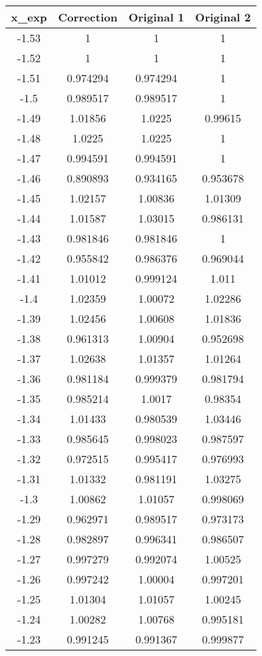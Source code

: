 \begin{table}[h!]
\centering
\begin{tabular}{|c|c|c|c|}
\hline
x_exp & Correction & Original 1 & Original 2 \\
\hline
-1.53 & 1 & 1 & 1 \\
-1.52 & 1 & 1 & 1 \\
-1.51 & 0.974294 & 0.974294 & 1 \\
-1.5 & 0.989517 & 0.989517 & 1 \\
-1.49 & 1.01856 & 1.0225 & 0.99615 \\
-1.48 & 1.0225 & 1.0225 & 1 \\
-1.47 & 0.994591 & 0.994591 & 1 \\
-1.46 & 0.890893 & 0.934165 & 0.953678 \\
-1.45 & 1.02157 & 1.00836 & 1.01309 \\
-1.44 & 1.01587 & 1.03015 & 0.986131 \\
-1.43 & 0.981846 & 0.981846 & 1 \\
-1.42 & 0.955842 & 0.986376 & 0.969044 \\
-1.41 & 1.01012 & 0.999124 & 1.011 \\
-1.4 & 1.02359 & 1.00072 & 1.02286 \\
-1.39 & 1.02456 & 1.00608 & 1.01836 \\
-1.38 & 0.961313 & 1.00904 & 0.952698 \\
-1.37 & 1.02638 & 1.01357 & 1.01264 \\
-1.36 & 0.981184 & 0.999379 & 0.981794 \\
-1.35 & 0.985214 & 1.0017 & 0.98354 \\
-1.34 & 1.01433 & 0.980539 & 1.03446 \\
-1.33 & 0.985645 & 0.998023 & 0.987597 \\
-1.32 & 0.972515 & 0.995417 & 0.976993 \\
-1.31 & 1.01332 & 0.981191 & 1.03275 \\
-1.3 & 1.00862 & 1.01057 & 0.998069 \\
-1.29 & 0.962971 & 0.989517 & 0.973173 \\
-1.28 & 0.982897 & 0.996341 & 0.986507 \\
-1.27 & 0.997279 & 0.992074 & 1.00525 \\
-1.26 & 0.997242 & 1.00004 & 0.997201 \\
-1.25 & 1.01304 & 1.01057 & 1.00245 \\
-1.24 & 1.00282 & 1.00768 & 0.995181 \\
-1.23 & 0.991245 & 0.991367 & 0.999877 \\

\end{tabular}
\end{table}
